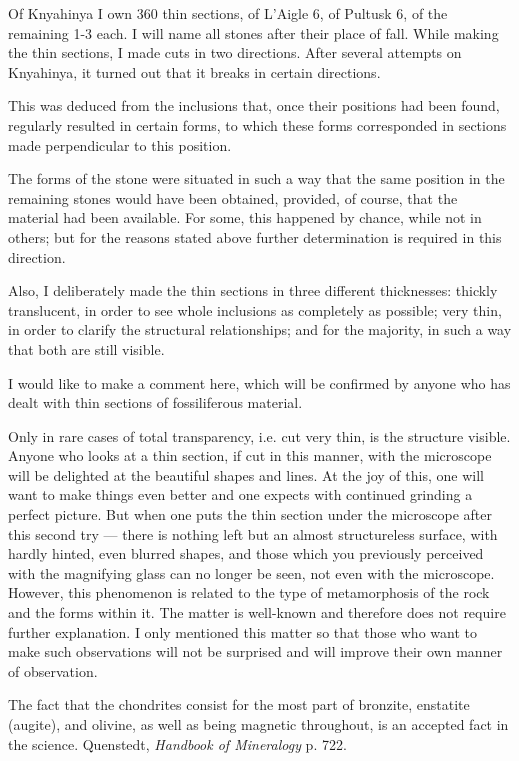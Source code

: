 \documentclass[a4paper, 12pt, oneside]{article}
\begin{document}
Of Knyahinya I own 360 thin sections, of L'Aigle 6, of Pultusk 6, of the remaining 1-3 each. I will name all stones after their place of fall. While making the thin sections, I made cuts in two directions. After several attempts on Knyahinya, it turned out that it breaks in certain directions.

This was deduced from the inclusions that, once their positions had been found, regularly resulted in certain forms, to which these forms corresponded in sections made perpendicular to this position.

The forms of the stone were situated in such a way that the same position in the remaining stones would have been obtained, provided, of course, that the material had been available. For some, this happened by chance, while not in others; but for the reasons stated above further determination is required in this direction.

Also, I deliberately made the thin sections in three different thicknesses: thickly translucent, in order to see whole inclusions as completely as possible; very thin, in order to clarify the structural relationships; and for the majority, in such a way that both are still visible.

I would like to make a comment here, which will be confirmed by anyone who has dealt with thin sections of fossiliferous material.

Only in rare cases of total transparency, i.e. cut very thin, is the structure visible. Anyone who looks at a thin section, if cut in this manner, with the microscope will be delighted at the beautiful shapes and lines. At the joy of this, one will want to make things even better and one expects with continued grinding a perfect picture. But when one puts the thin section under the microscope after this second try — there is nothing left but an almost structureless surface, with hardly hinted, even blurred shapes, and those which you previously perceived with the magnifying glass can no longer be seen, not even with the microscope. However, this phenomenon is related to the type of metamorphosis of the rock and the forms within it. The matter is well-known and therefore does not require further explanation. I only mentioned this matter so that those who want to make such observations will not be surprised and will improve their own manner of observation.

The fact that the chondrites consist for the most part of bronzite, enstatite (augite), and olivine, as well as being magnetic throughout, is an accepted fact in the science. Quenstedt, \emph{Handbook of Mineralogy} p. 722.
\end{document}
